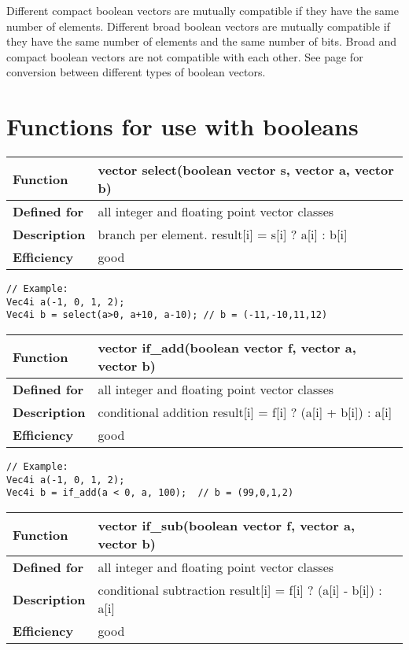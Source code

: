 \documentclass[vcl_manual.tex]{subfiles}
\begin{document}
Different compact boolean vectors are mutually compatible if they have the same number of elements. Different broad boolean vectors are mutually compatible if they have the same number of elements and the same number of bits. Broad and compact boolean vectors are not compatible with each other. See page \pageref{ConversionBetweenBooleanTypes} for conversion between different types of boolean vectors.


\section{Functions for use with booleans}\label{FunctionsForBooleans}

\begin{tabular}{|p{30mm}|p{120mm}|}
\hline
\bfseries Function & vector select(boolean vector s, vector a, vector b) \\ \hline
\bfseries Defined for & all integer and floating point vector classes \\ \hline
\bfseries Description & branch per element.\newline
result[i] = s[i] ? a[i] : b[i] \\ \hline
\bfseries Efficiency & good \\ \hline
\end{tabular}
\begin{lstlisting}[frame=none]
// Example:
Vec4i a(-1, 0, 1, 2);
Vec4i b = select(a>0, a+10, a-10); // b = (-11,-10,11,12)
\end{lstlisting}


\begin{tabular}{|p{30mm}|p{120mm}|}
\hline
\bfseries Function & vector if\_add(boolean vector f, vector a, vector b) \\ \hline
\bfseries Defined for & all integer and floating point vector classes \\ \hline
\bfseries Description & conditional addition \newline
result[i] = f[i] ? (a[i] + b[i]) : a[i] \\ \hline
\bfseries Efficiency & good \\ \hline
\end{tabular}
\begin{lstlisting}[frame=none]
// Example:
Vec4i a(-1, 0, 1, 2);
Vec4i b = if_add(a < 0, a, 100);  // b = (99,0,1,2)
\end{lstlisting}

\begin{tabular}{|p{30mm}|p{120mm}|}
\hline
\bfseries Function & vector if\_sub(boolean vector f, vector a, vector b) \\ \hline
\bfseries Defined for & all integer and floating point vector classes \\ \hline
\bfseries Description & conditional subtraction \newline
result[i] = f[i] ? (a[i] - b[i]) : a[i] \\ \hline
\bfseries Efficiency & good \\ \hline
\end{tabular}
\end{document}
